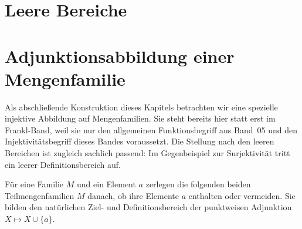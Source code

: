 \documentclass[main.tex]{subfiles}
\begin{document}
\section{Leere Bereiche}

\begin{tabproofsplit}


\closeproofpart

  \setcounter{proofstepnr}{1}%


\closeproofpart

  \setcounter{proofstepnr}{7}%

\closeproofpart
\end{tabproofsplit}


\section{Adjunktionsabbildung einer Mengenfamilie}

Als abschließende Konstruktion dieses Kapitels betrachten wir eine spezielle
injektive Abbildung auf Mengenfamilien. Sie steht bereits hier statt erst im
Frankl-Band, weil sie nur den allgemeinen Funktionsbegriff aus Band~05 und den
Injektivitätsbegriff dieses Bandes voraussetzt. Die Stellung nach den leeren
Bereichen ist zugleich sachlich passend: Im Gegenbeispiel zur Surjektivität
tritt ein leerer Definitionsbereich auf.

Für eine Familie \(M\) und ein Element \(a\) zerlegen die folgenden beiden
Teilmengenfamilien \(M\) danach, ob ihre Elemente \(a\) enthalten oder
vermeiden. Sie bilden den natürlichen Ziel- und Definitionsbereich der
punktweisen Adjunktion \(X\mapsto X\cup\{a\}\).
\end{document}
